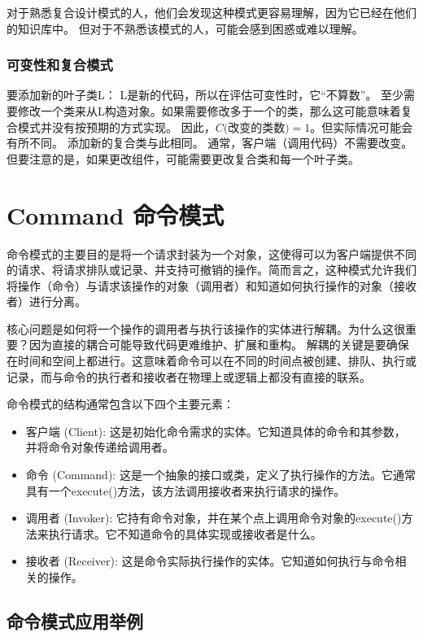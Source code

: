 对于熟悉复合设计模式的人，他们会发现这种模式更容易理解，因为它已经在他们的知识库中。
但对于不熟悉该模式的人，可能会感到困惑或难以理解。

\subsubsection{可变性和复合模式}
要添加新的叶子类L：
L是新的代码，所以在评估可变性时，它“不算数”。
至少需要修改一个类来从L构造对象。如果需要修改多于一个的类，那么这可能意味着复合模式并没有按预期的方式实现。
因此，$C\text{(改变的类数)}= 1$。但实际情况可能会有所不同。
添加新的复合类与此相同。
通常，客户端（调用代码）不需要改变。
但要注意的是，如果更改组件，可能需要更改复合类和每一个叶子类。

\section{Command 命令模式}

命令模式的主要目的是将一个请求封装为一个对象，这使得可以为客户端提供不同的请求、将请求排队或记录、并支持可撤销的操作。简而言之，这种模式允许我们将操作（命令）与请求该操作的对象（调用者）和知道如何执行操作的对象（接收者）进行分离。

核心问题是如何将一个操作的调用者与执行该操作的实体进行解耦。为什么这很重要？因为直接的耦合可能导致代码更难维护、扩展和重构。
解耦的关键是要确保在时间和空间上都进行。这意味着命令可以在不同的时间点被创建、排队、执行或记录，而与命令的执行者和接收者在物理上或逻辑上都没有直接的联系。

命令模式的结构通常包含以下四个主要元素：
\begin{itemize}
	\item 客户端 (Client): 这是初始化命令需求的实体。它知道具体的命令和其参数，并将命令对象传递给调用者。
	\item 命令 (Command): 这是一个抽象的接口或类，定义了执行操作的方法。它通常具有一个execute()方法，该方法调用接收者来执行请求的操作。
	\item 调用者 (Invoker): 它持有命令对象，并在某个点上调用命令对象的execute()方法来执行请求。它不知道命令的具体实现或接收者是什么。
	\item 接收者 (Receiver): 这是命令实际执行操作的实体。它知道如何执行与命令相关的操作。
\end{itemize}


\subsection{命令模式应用举例}

